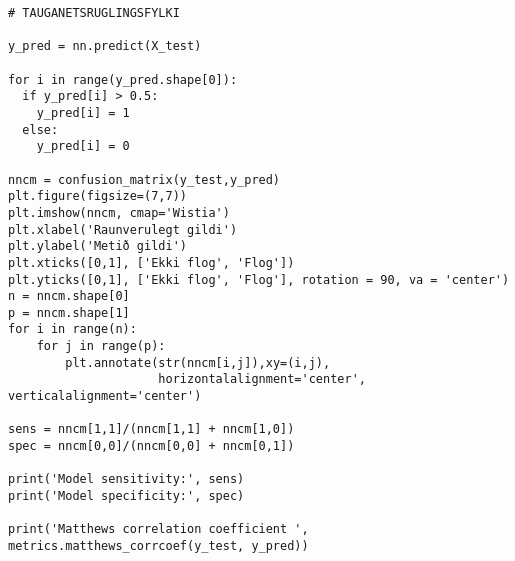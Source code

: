 \documentclass[11pt]{article}
\begin{document}
\begin{verbatim}
# TAUGANETSRUGLINGSFYLKI

y_pred = nn.predict(X_test)

for i in range(y_pred.shape[0]):
  if y_pred[i] > 0.5:
    y_pred[i] = 1
  else:
    y_pred[i] = 0
    
nncm = confusion_matrix(y_test,y_pred)
plt.figure(figsize=(7,7))
plt.imshow(nncm, cmap='Wistia')
plt.xlabel('Raunverulegt gildi')
plt.ylabel('Metið gildi')
plt.xticks([0,1], ['Ekki flog', 'Flog'])
plt.yticks([0,1], ['Ekki flog', 'Flog'], rotation = 90, va = 'center')
n = nncm.shape[0]
p = nncm.shape[1]
for i in range(n):
    for j in range(p):        
        plt.annotate(str(nncm[i,j]),xy=(i,j), 
                     horizontalalignment='center', verticalalignment='center')
        
sens = nncm[1,1]/(nncm[1,1] + nncm[1,0])
spec = nncm[0,0]/(nncm[0,0] + nncm[0,1])

print('Model sensitivity:', sens)
print('Model specificity:', spec)

print('Matthews correlation coefficient ', metrics.matthews_corrcoef(y_test, y_pred))  
\end{verbatim}
\newpage
\end{document}
